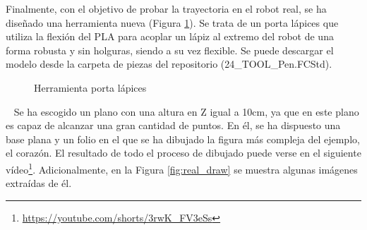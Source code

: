 Finalmente, con el objetivo de probar la trayectoria en el robot real, se ha diseñado una herramienta nueva (Figura \ref{fig:pen_tool}). Se trata de un porta lápices que utiliza la 
flexión del PLA para acoplar un lápiz al extremo del robot de una forma robusta y sin holguras, siendo a su vez flexible. Se puede descargar el modelo 
desde la carpeta de piezas del repositorio (24\_TOOL\_Pen.FCStd).
\begin{figure} [ht!]
    \centering  
    \hspace{1cm}
    \caption{Herramienta porta lápices}
    \label{fig:pen_tool}
\end{figure}\ 
\newpage
Se ha escogido un plano con una altura en Z igual a 10cm, ya que en este plano es capaz de alcanzar una gran cantidad de puntos. En él, se ha dispuesto 
una base plana y un folio en el que se ha dibujado la figura más compleja del ejemplo, el corazón. El resultado de todo el proceso de dibujado puede verse en el siguiente 
vídeo\footnote{\url{https://youtube.com/shorts/3rwK_FV3eSs}}. Adicionalmente, en la Figura \ref{fig:real_draw} se muestra algunas imágenes extraídas de él.
